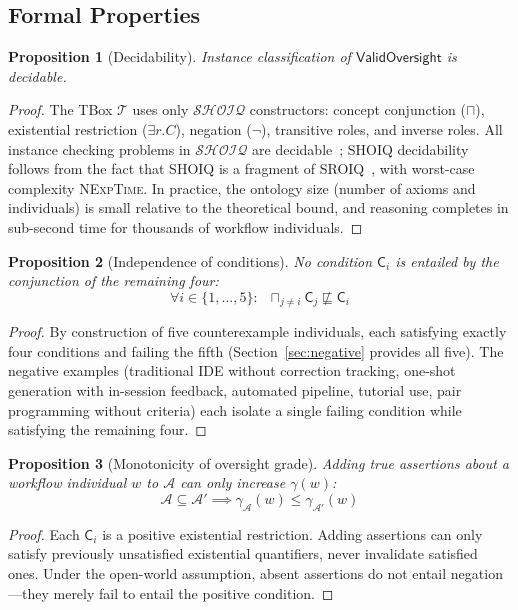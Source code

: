 \documentclass[11pt]{article}
\newtheorem{proposition}{Proposition}[section]
\newcommand{\DL}{\ensuremath{\mathcal{SHOIQ}}\xspace}
\newcommand{\TBox}{\ensuremath{\mathcal{T}}\xspace}
\newcommand{\ABox}{\ensuremath{\mathcal{A}}\xspace}
\newcommand{\sqsub}{\sqsubseteq}
\DeclareMathOperator*{\bigsqcap}{\sqcap}
\begin{document}
\subsection{Formal Properties}
\label{sec:properties}

\begin{proposition}[Decidability]
\label{prop:decidability}
Instance classification of $\mathsf{ValidOversight}$ is decidable.
\end{proposition}
\begin{proof}
The TBox \TBox uses only \DL constructors: concept conjunction ($\sqcap$), existential restriction ($\exists r.C$), negation ($\neg$), transitive roles, and inverse roles.
All instance checking problems in \DL are decidable~\citep{baader2003description}; SHOIQ decidability follows from the fact that SHOIQ is a fragment of SROIQ~\citep{horrocks2006even}, with worst-case complexity \textsc{NExpTime}.
In practice, the ontology size (number of axioms and individuals) is small relative to the theoretical bound, and reasoning completes in sub-second time for thousands of workflow individuals.
\end{proof}

\begin{proposition}[Independence of conditions]
\label{prop:independence}
No condition $\mathsf{C}_i$ is entailed by the conjunction of the remaining four:
\begin{equation}
  \forall i \in \{1,...,5\}: \;\;
  \bigsqcap_{j \neq i} \mathsf{C}_j \not\sqsub \mathsf{C}_i
\end{equation}
\end{proposition}
\begin{proof}
By construction of five counterexample individuals, each satisfying exactly four conditions and failing the fifth (Section~\ref{sec:negative} provides all five).
The negative examples (traditional IDE without correction tracking, one-shot generation with in-session feedback, automated pipeline, tutorial use, pair programming without criteria) each isolate a single failing condition while satisfying the remaining four.
\end{proof}

\begin{proposition}[Monotonicity of oversight grade]
\label{prop:monotonicity}
Adding true assertions about a workflow individual $w$ to \ABox can only increase $\gamma(w)$:
\begin{equation}
  \ABox \subseteq \ABox' \implies \gamma_{\ABox}(w) \leq \gamma_{\ABox'}(w)
\end{equation}
\end{proposition}
\begin{proof}
Each $\mathsf{C}_i$ is a positive existential restriction.
Adding assertions can only satisfy previously unsatisfied existential quantifiers, never invalidate satisfied ones.
Under the open-world assumption, absent assertions do not entail negation---they merely fail to entail the positive condition.
\end{proof}
\end{document}
